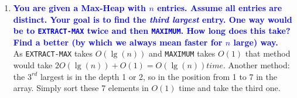 \documentclass[11pt]{article}
\begin{document}
\begin{enumerate}
\item \textbf{\textcolor{blue}{You are given a Max-Heap with $n$ entries. Assume all entries are distinct. Your goal is to find the {\em third largest} entry. One way would be to {\tt EXTRACT-MAX} twice and then {\tt MAXIMUM}. How long does this take? Find a better (by which we always mean faster for $n$ large) way.}}
    \\ As {\tt EXTRACT-MAX} takes $O(\lg(n))$ and {\tt MAXIMUM} takes $O(1)$ that method would take $2O(\lg(n))+O(1) = O(\lg(n)) time$. Another method: the $3^{rd}$ largest is in the depth 1 or 2, so in the position from 1 to 7 in the array. Simply sort these 7 elements in $O(1)$ time and take the third one.

\end{enumerate}
\end{document}
